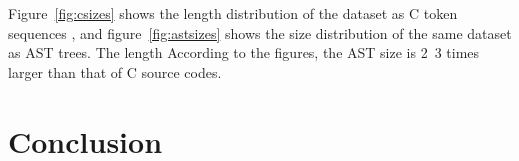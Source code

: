 \documentclass[senior,final,11pt]{iscs-thesis}
\begin{document}
Figure~\ref{fig:csizes} shows the length distribution of the dataset as C token sequences
, and figure~\ref{fig:astsizes} shows the size distribution of the same dataset as AST trees.
The length 
According to the figures, the AST size is 2~3 times larger than that of C source codes.
  












\chapter{Conclusion}



\end{document}
